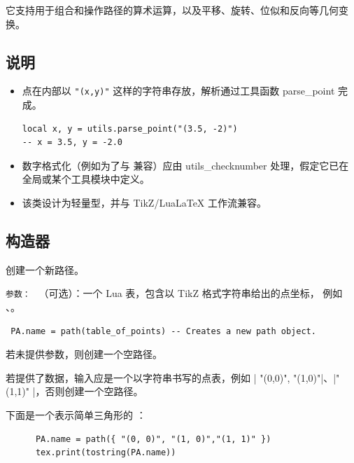 它支持用于组合和操作路径的算术运算，以及平移、旋转、位似和反向等几何变换。

\subsection{说明}

\begin{itemize}
\item 点在内部以 \texttt{"(x,y)"} 这样的字符串存放，解析通过工具函数 parse\_point 完成。

\begin{verbatim}
local x, y = utils.parse_point("(3.5, -2)")
-- x = 3.5, y = -2.0
\end{verbatim}


\item 数字格式化（例如为了与 \TIKZ{} 兼容）应由 utils\_checknumber 处理，假定它已在全局或某个工具模块中定义。

\item 该类设计为轻量型，并与 TikZ/LuaLaTeX 工作流兼容。

\end{itemize}





\subsection{构造器 }

创建一个新路径。

\medskip

\texttt{参数： }
 （可选）：一个 Lua 表，包含以 TikZ 格式字符串给出的点坐标，
        例如 、。


\begin{center}
  \begin{verbatim}
 PA.name = path(table_of_points) -- Creates a new path object.
  \end{verbatim}
\end{center}

\medskip

若未提供参数，则创建一个空路径。


若提供了数据，输入应是一个以字符串书写的点表，例如 |{ "(0,0)", "(1,0)"|、|"(1,1)" }|，否则创建一个空路径。

下面是一个表示简单三角形的 ：

  \begin{mybox}
    \begin{verbatim}
      PA.name = path({ "(0, 0)", "(1, 0)","(1, 1)" })
      tex.print(tostring(PA.name))
    \end{verbatim}
  \end{mybox}



